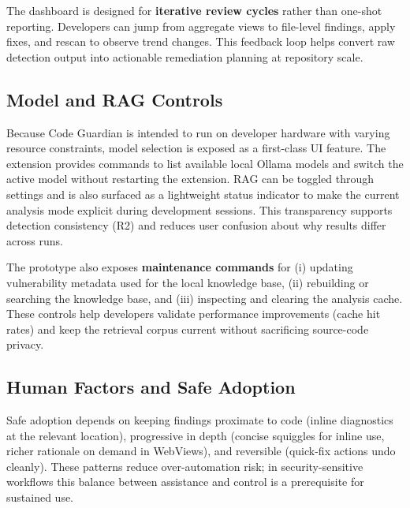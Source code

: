 The dashboard is designed for \textbf{iterative review cycles} rather than one-shot reporting. Developers can jump from aggregate views to file-level findings, apply fixes, and rescan to observe trend changes. This feedback loop helps convert raw detection output into actionable remediation planning at repository scale.

\subsection{Model and RAG Controls}
\label{subsec:ui-controls}

Because Code Guardian is intended to run on developer hardware with varying resource constraints, model selection is exposed as a first-class UI feature. The extension provides commands to list available local Ollama models and switch the active model without restarting the extension. RAG can be toggled through settings and is also surfaced as a lightweight status indicator to make the current analysis mode explicit during development sessions. This transparency supports detection consistency (R2) and reduces user confusion about why results differ across runs.

The prototype also exposes \textbf{maintenance commands} for (i) updating vulnerability metadata used for the local knowledge base, (ii) rebuilding or searching the knowledge base, and (iii) inspecting and clearing the analysis cache. These controls help developers validate performance improvements (cache hit rates) and keep the retrieval corpus current without sacrificing source-code privacy.

\subsection{Human Factors and Safe Adoption}
\label{subsec:ui-human-factors}

Safe adoption depends on keeping findings proximate to code (inline diagnostics at the relevant location), progressive in depth (concise squiggles for inline use, richer rationale on demand in WebViews), and reversible (quick-fix actions undo cleanly). These patterns reduce over-automation risk; in security-sensitive workflows this balance between assistance and control is a prerequisite for sustained use.
